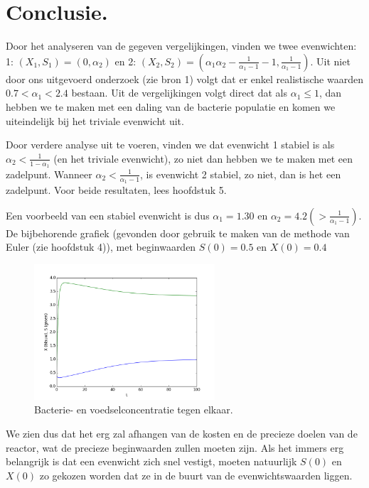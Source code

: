 
\chapter{Conclusie.}
Door het analyseren van de gegeven vergelijkingen, vinden we twee evenwichten: 1: $(X_1, S_1) = (0, \alpha_2)$ en 2: $(X_2, S_2) = \left( \alpha_1\alpha_2 - \frac{1}{\alpha_1 - 1} - 1, \frac{1}{\alpha_1 - 1}\right)$. Uit niet door ons uitgevoerd onderzoek (zie bron 1) volgt dat er enkel realistische waarden $0.7< \alpha_1 < 2.4$ bestaan. Uit de vergelijkingen volgt direct dat als $\alpha_1 \leq 1$, dan hebben we te maken met een daling van de bacterie populatie en komen we uiteindelijk bij het triviale evenwicht uit. 

Door verdere analyse uit te voeren, vinden we dat evenwicht 1 stabiel is als $\alpha_2 < \frac{1}{1 - \alpha_1}$ (en het triviale evenwicht), zo niet dan hebben we te maken met een zadelpunt. Wanneer $\alpha_2 < \frac{1}{\alpha_1 - 1}$, is evenwicht 2 stabiel, zo niet, dan is het een zadelpunt. Voor beide resultaten, lees hoofdstuk 5. 

Een voorbeeld van een stabiel evenwicht is dus $\alpha_1 = 1.30$ en $\alpha_2 = 4.2 (> \frac{1}{\alpha_1 - 1})$. De bijbehorende grafiek (gevonden door gebruik te maken van de methode van Euler (zie hoofdstuk 4)), met beginwaarden $S(0) = 0.5$ en $X(0) = 0.4$

\begin{figure}[h]
	\centering
	\includegraphics[width=0.6\textwidth]{../images/figure_5.png}
	\caption{Bacterie- en voedselconcentratie tegen elkaar.}
\end{figure}

We zien dus dat het erg zal afhangen van de kosten en de precieze doelen van de reactor, wat de precieze beginwaarden zullen moeten zijn. Als het immers erg belangrijk is dat een evenwicht zich snel vestigt, moeten natuurlijk $S(0)$ en $X(0)$ zo gekozen worden dat ze in de buurt van de evenwichtswaarden liggen. 